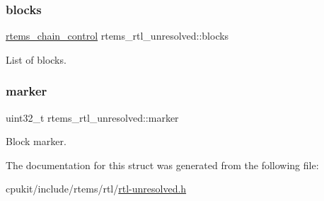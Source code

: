 \subsubsection{\texorpdfstring{blocks}{blocks}}
{\footnotesize\ttfamily \mbox{\hyperlink{unionChain__Control}{rtems\+\_\+chain\+\_\+control}} rtems\+\_\+rtl\+\_\+unresolved\+::blocks}

List of blocks. \mbox{\label{structrtems__rtl__unresolved_a93f2bb571fd25eb1d9cde5ff46a76fd3}} 
\subsubsection{\texorpdfstring{marker}{marker}}
{\footnotesize\ttfamily uint32\+\_\+t rtems\+\_\+rtl\+\_\+unresolved\+::marker}

Block marker. 

The documentation for this struct was generated from the following file\+:\begin{DoxyCompactItemize}
\item 
cpukit/include/rtems/rtl/\mbox{\hyperlink{rtl-unresolved_8h}{rtl-\/unresolved.\+h}}\end{DoxyCompactItemize}
